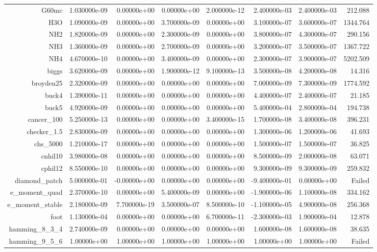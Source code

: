 \documentclass[10pt]{article}
\begin{document}
{{{\begin{table}[h]
\begin{center}
{\begin{tabular}{r|r|r|r|r|r|r|r}
      G60mc & 1.030000e-09 & 0.00000e+00 & 0.00000e+00 & 2.000000e-12 &
      2.400000e-03 & 2.400000e-03 & 212.088\\
      H3O & 1.090000e-09 & 0.00000e+00 & 3.700000e-09 & 0.00000e+00 &
      3.100000e-07 & 3.600000e-07 & 1344.764\\
      NH2 & 1.820000e-09 & 0.00000e+00 & 2.300000e-09 & 0.00000e+00 &
      3.800000e-07 & 4.300000e-07 & 290.156\\
      NH3 & 1.360000e-09 & 0.00000e+00 & 2.700000e-09 & 0.00000e+00 &
      3.200000e-07 & 3.500000e-07 & 1367.722\\
      NH4 & 4.670000e-10 & 0.00000e+00 & 3.400000e-09 & 0.00000e+00 &
      2.300000e-07 & 3.900000e-07 & 5202.509\\
      biggs & 3.620000e-09 & 0.00000e+00 & 1.900000e-12 & 9.100000e-13 &
      3.500000e-08 & 4.200000e-08 & 14.316\\
      broyden25 & 2.320000e-09 & 0.00000e+00 & 0.00000e+00 & 0.00000e+00 &
      7.000000e-09 & 7.300000e-09 & 1774.592\\
      buck4 & 1.390000e-11 & 0.00000e+00 & 0.00000e+00 & 0.00000e+00 &
      4.400000e-07 & 2.400000e-07 & 21.185\\
      buck5 & 4.920000e-09 & 0.00000e+00 & 0.00000e+00 & 0.00000e+00 &
      5.400000e-04 & 2.800000e-04 & 194.738\\
      cancer\_100 & 5.250000e-13 & 0.00000e+00 & 0.00000e+00 & 3.400000e-15 &
      1.700000e-08 & 3.400000e-08 & 396.231\\
      checker\_1.5 & 2.830000e-09 & 0.00000e+00 & 0.00000e+00 & 0.00000e+00 &
      1.300000e-06 & 1.200000e-06 & 41.693\\
      chs\_5000 & 1.210000e-17 & 0.00000e+00 & 0.00000e+00 & 0.00000e+00 &
      1.500000e-07 & 1.500000e-07 & 36.825\\
      cnhil10 & 3.980000e-08 & 0.00000e+00 & 0.00000e+00 & 0.00000e+00 &
      8.500000e-09 & 2.000000e-08 & 63.071\\
      cphil12 & 8.550000e-10 & 0.00000e+00 & 0.00000e+00 & 0.00000e+00 &
      9.300000e-09 & 9.300000e-09 & 259.832\\
      diamond\_patch & 5.000000e-01 & -0.00000e+00 & 0.00000e+00 & 0.00000e+00
      & -9.400000e-01 & 0.00000e+00 & Failed\\
      e\_moment\_quad & 2.370000e-10 & 0.00000e+00 & 5.400000e-09 &
      0.00000e+00 & -1.900000e-06 & 1.100000e-08 & 334.162\\
      e\_moment\_stable & 2.180000e-09 & 7.700000e-19 & 3.500000e-07 &
      8.500000e-10 & -1.100000e-05 & 4.900000e-08 & 256.368\\
      foot & 1.130000e-04 & 0.00000e+00 & 0.00000e+00 & 6.700000e-11 &
      -2.300000e-03 & 1.900000e-04 & 12.878\\
      hamming\_8\_3\_4 & 2.740000e-09 & 0.00000e+00 & 0.00000e+00 &
      0.00000e+00 & 1.600000e-08 & 1.600000e-08 & 38.635\\
      hamming\_9\_5\_6 & 1.00000e+00 & 1.00000e+00 & 1.00000e+00 & 1.00000e+00
      & 1.00000e+00 & 1.00000e+00 & Failed\\
      


\end{tabular}}
\end{center}
\end{table}}}}
\end{document}
